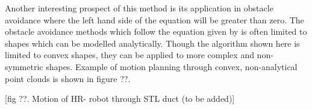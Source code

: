 \documentclass[12pt,a4]{article}
\begin{document}
Another interesting prospect of this method is its application in obstacle avoidance where the left hand side of the equation  will be greater than zero. The obstacle avoidance methods which follow the equation given by  is often limited to shapes which can be modelled analytically. Though the algorithm shown here is limited to convex shapes, they can be applied to more complex and non-symmetric shapes. Example of motion planning through convex, non-analytical point clouds is shown in figure ??.

[fig ??. Motion of HR- robot through STL duct (to be added)]

%

%
\end{document}
